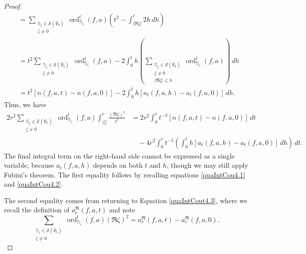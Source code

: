 \documentclass[10pt,a4paper]{amsart}
\newcommand{\ordt}{\operatorname{ord}^t}
\newcommand{\s}{{\mathbb{S}}}
\begin{document}
\begin{proof}
\begin{align}
&= \sum_{\substack{ \s_\zeta\in\mathcal{S}(\overline{\mathbb B_t}) \nonumber \\ \zeta\neq 0}}\ordt_{\s_\zeta}(f,a)\left(t^2 -\int_{|\Re \zeta|}^t2h \,dh\right) \\
&= t^2 \sum_{\substack{ \s_\zeta\in\mathcal{S}(\overline{\mathbb B_t}) \nonumber\\ \zeta\neq 0}}\ordt_{\s_\zeta}(f,a)-2\int_0^t h\left( \sum_{\substack{ \s_\zeta\in\mathcal{S}(\overline{\mathbb B_t}) \\ \zeta\neq 0 \\|\Re \zeta|\leq h}}\ordt_{\s_\zeta}(f,a)\right)\,dh \\ 
&=t^2[n(f,a,t)-n(f,a,0)]-2\int_0^t h [a_t(f,a,h)-a_t(f,a,0)]\,dh.
\end{align}
Thus, we have \begin{align*}
      2r^2\sum_{\substack{ \s_\zeta\in\mathcal{S}(\overline{\mathbb B_r}) \\ \zeta\neq 0}}\ordt_{\s_\zeta}(f,a)\int_{|\zeta|}^r\frac{(\Re \zeta)^2}{t^5} 
      &= 2r^2\int_0^rt^{-3}[n(f,a,t)-n(f,a,0)]\, dt \\
      &\quad- 4r^2\int_0^rt^{-5}\left(\int_0^th[a_t(f,a,h)-a_t(f,a,0)]\,dh \right)\,dt. 
\end{align*}
The final integral term on the right-hand side cannot be expressed as a single variable, because $a_t(f,a,h)$ depends on both $t$ and $h$, though we may still apply Fubini's theorem. The first equality follows by recalling equations \ref{quaIntCou4.1} and \ref{quaIntCou4.2}. 

The second equality comes from returning to Equation \ref{quaIntCout4.3}, where we recall the definition of $a_r^\Re (f,a,t)$ and note \[\sum_{\substack{ \s_\zeta\in\mathcal{S}(\overline{\mathbb B_t}) \\ \zeta\neq 0}}\ordt_{\s_\zeta}(f,a)(\Re \zeta)^2=a_r^\Re (f,a,t)-a_r^\Re (f,a,0).\] 

\end{proof}
\end{document}
